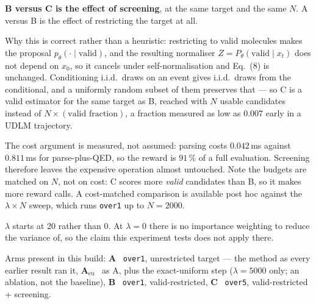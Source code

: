 \documentclass[11pt]{article}
\begin{document}
\textbf{B versus C is the effect of screening}, at the same target and the same
$N$. A versus B is the effect of restricting the target at all.

Why this is correct rather than a heuristic: restricting to valid molecules makes
the proposal $p_\theta(\cdot \mid \text{valid})$, and the resulting
normaliser $Z = P_\theta(\text{valid} \mid x_t)$ does not depend on $x_0$, so it
cancels under self-normalisation and Eq.~(8) is unchanged. Conditioning i.i.d.\
draws on an event gives i.i.d.\ draws from the conditional, and a uniformly
random subset of them preserves that --- so C is a valid estimator for the same
target as B, reached with $N$ usable candidates instead of
$N \times (\text{valid fraction})$, a fraction measured as low as $0.007$ early
in a UDLM trajectory.

The cost argument is measured, not assumed: parsing costs $0.042$\,ms against
$0.811$\,ms for parse-plus-QED, so the reward is $91\,\%$ of a full evaluation.
Screening therefore leaves the expensive operation almost untouched. Note the
budgets are matched on $N$, not on cost: C scores more \emph{valid} candidates
than B, so it makes more reward calls. A cost-matched comparison is available
post hoc against the $\lambda \times N$ sweep, which runs \texttt{over1} up to
$N = 2000$.

$\lambda$ starts at 20 rather than 0. At $\lambda = 0$ there is no importance
weighting to reduce the variance of, so the claim this experiment tests does not
apply there.

Arms present in this build: \textbf{A} \ \texttt{over1}, unrestricted target --- the method as every earlier result ran it, \textbf{A$_{\mathrm{eu}}$} \ as A, plus the exact-uniform step ($\lambda = 5000$ only; an ablation, not the baseline), \textbf{B} \ \texttt{over1}, valid-restricted, \textbf{C} \ \texttt{over5}, valid-restricted + screening.
\end{document}
